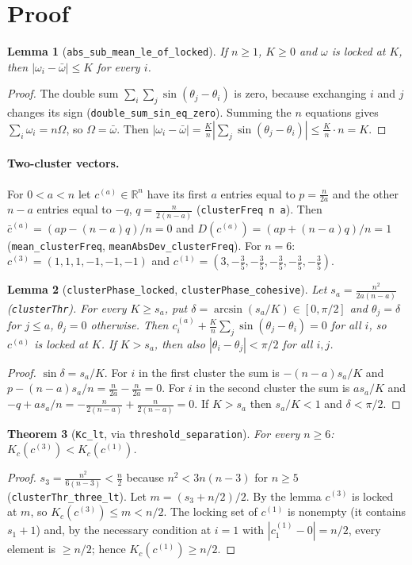 \documentclass[11pt]{article}
\newtheorem{theorem}{Theorem}
\newtheorem{lemma}[theorem]{Lemma}
\theoremstyle{definition}
\theoremstyle{remark}
\begin{document}
\section{Proof}

\begin{lemma}[\texttt{abs\_sub\_mean\_le\_of\_locked}]
If $n\ge1$, $K\ge0$ and $\omega$ is locked at $K$, then $|\omega_i-\bar\omega|\le K$ for every $i$.
\end{lemma}
\begin{proof}
The double sum $\sum_i\sum_j\sin(\theta_j-\theta_i)$ is zero, because exchanging $i$ and $j$
changes its sign (\texttt{double\_sum\_sin\_eq\_zero}). Summing the $n$ equations gives
$\sum_i\omega_i=n\Omega$, so $\Omega=\bar\omega$. Then
$|\omega_i-\bar\omega| = \frac Kn|\sum_j\sin(\theta_j-\theta_i)|\le \frac Kn\cdot n=K$.
\end{proof}

\paragraph{Two-cluster vectors.} For $0<a<n$ let $c^{(a)}\in\mathbb R^n$ have its first $a$
entries equal to $p=\frac{n}{2a}$ and the other $n-a$ entries equal to $-q$, $q=\frac{n}{2(n-a)}$
(\texttt{clusterFreq n a}). Then $\bar c^{(a)}=(ap-(n-a)q)/n=0$ and
$D(c^{(a)})=(ap+(n-a)q)/n=1$ (\texttt{mean\_clusterFreq}, \texttt{meanAbsDev\_clusterFreq}).
For $n=6$: $c^{(3)}=(1,1,1,-1,-1,-1)$ and $c^{(1)}=(3,-\tfrac35,-\tfrac35,-\tfrac35,-\tfrac35,-\tfrac35)$.

\begin{lemma}[\texttt{clusterPhase\_locked}, \texttt{clusterPhase\_cohesive}]
Let $s_a=\frac{n^2}{2a(n-a)}$ (\texttt{clusterThr}). For every $K\ge s_a$, put
$\delta=\arcsin(s_a/K)\in[0,\pi/2]$ and $\theta_j=\delta$ for $j\le a$, $\theta_j=0$ otherwise.
Then $c^{(a)}_i+\frac Kn\sum_j\sin(\theta_j-\theta_i)=0$ for all $i$, so $c^{(a)}$ is locked at
$K$. If $K>s_a$, then also $|\theta_i-\theta_j|<\pi/2$ for all $i,j$.
\end{lemma}
\begin{proof}
$\sin\delta=s_a/K$. For $i$ in the first cluster the sum is $-(n-a)s_a/K$ and
$p-(n-a)s_a/n = \frac n{2a}-\frac n{2a}=0$. For $i$ in the second cluster the sum is $a s_a/K$
and $-q+a s_a/n=-\frac n{2(n-a)}+\frac{n}{2(n-a)}=0$. If $K>s_a$ then $s_a/K<1$ and $\delta<\pi/2$.
\end{proof}

\begin{theorem}[\texttt{Kc\_lt}, via \texttt{threshold\_separation}]
For every $n\ge 6$: $K_c(c^{(3)}) < K_c(c^{(1)})$.
\end{theorem}
\begin{proof}
$s_3=\frac{n^2}{6(n-3)}<\frac n2$ because $n^2<3n(n-3)$ for $n\ge 5$
(\texttt{clusterThr\_three\_lt}). Let $m=(s_3+n/2)/2$. By the lemma $c^{(3)}$ is locked at $m$,
so $K_c(c^{(3)})\le m<n/2$. The locking set of $c^{(1)}$ is nonempty (it contains $s_1+1$) and,
by the necessary condition at $i=1$ with $|c^{(1)}_1-0|=n/2$, every element is $\ge n/2$; hence
$K_c(c^{(1)})\ge n/2$.
\end{proof}
\end{document}
